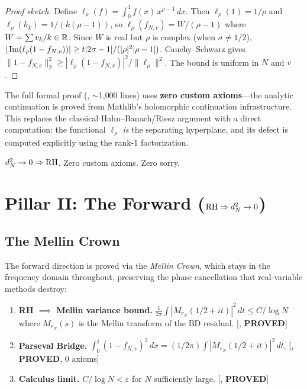\documentclass[11pt,a4paper]{article}
\begin{document}
\begin{proof}[Proof sketch]
Define $\ell_\rho(f) = \int_0^1 f(x)\,x^{\rho-1}\,dx$. Then
$\ell_\rho(1) = 1/\rho$ and $\ell_\rho(h_k) = 1/(k(\rho-1))$,
so $\ell_\rho(f_{N,v}) = W/(\rho-1)$ where $W = \sum v_k/k \in \mathbb{R}$.
Since $W$ is real but $\rho$ is complex (when $\sigma \neq 1/2$),
$|\operatorname{Im}(\ell_\rho(1 - f_{N,v}))| \geq t|2\sigma-1|/(|\rho|^2|\rho-1|)$.
Cauchy--Schwarz gives
$\|1 - f_{N,v}\|_2^2 \geq |\ell_\rho(1-f_{N,v})|^2/\|\ell_\rho\|^2$.
The bound is uniform in $N$ and $v$.
\end{proof}

The full formal proof (, $\sim$1{,}000 lines) uses
\textbf{zero custom axioms}---the analytic continuation is proved
from Mathlib's holomorphic continuation infrastructure. This replaces
the classical Hahn--Banach/Riesz argument with a direct computation:
the functional $\ell_\rho$ \emph{is} the separating hyperplane, and
its defect is computed explicitly using the rank-1 factorization.

\begin{corollary}
$d_N^2 \to 0 \Rightarrow \mathrm{RH}$. Zero custom axioms. Zero sorry.
\end{corollary}

\section{Pillar II: The Forward (\texorpdfstring{$\mathrm{RH} \Rightarrow d_N^2 \to 0$}{RH ⟹ d²→0})}
\label{sec:forward}

\subsection{The Mellin Crown}

The forward direction is proved via the \emph{Mellin Crown}, which
stays in the frequency domain throughout, preserving the phase
cancellation that real-variable methods destroy:

\begin{enumerate}
  \item \textbf{RH $\implies$ Mellin variance bound.}
    $\frac{1}{2\pi}\int|M_{r_N}(1/2+it)|^2\,dt \leq C/\log N$
    where $M_{r_N}(s)$ is the Mellin transform of the BD residual.
    [, \textbf{PROVED}]

  \item \textbf{Parseval Bridge.}
    $\int_0^1(1-f_{N,v})^2\,dx =
    (1/2\pi)\int|M_{r_N}(1/2+it)|^2\,dt$.
    [, \textbf{PROVED}, 0 axioms]

  \item \textbf{Calculus limit.} $C/\log N < \varepsilon$ for $N$
    sufficiently large. [, \textbf{PROVED}]
\end{enumerate}
\end{document}
